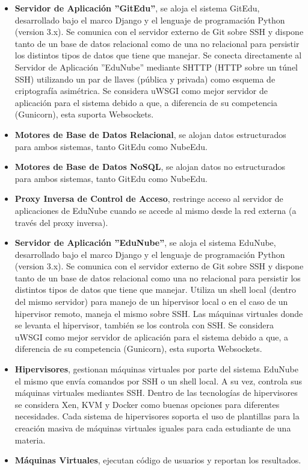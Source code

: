 \begin{itemize}
    \item \textbf{Servidor de Aplicación ''GitEdu''}, se aloja el sistema GitEdu, desarrollado bajo el marco Django y el lenguaje de programación Python (version 3.x). Se comunica con el servidor externo de Git sobre SSH y dispone tanto de un base de datos relacional como de una no relacional para persistir los distintos tipos de datos que tiene que manejar. Se conecta directamente al Servidor de Aplicación ''EduNube'' mediante SHTTP (HTTP sobre un túnel SSH) utilizando un par de llaves (pública y privada) como esquema de criptografía asimétrica. Se considera uWSGI como mejor servidor de aplicación para el sistema debido a que, a diferencia de su competencia (Gunicorn), esta suporta Websockets.
    \item \textbf{Motores de Base de Datos Relacional}, se alojan datos estructurados para ambos sistemas, tanto GitEdu como NubeEdu.
    \item \textbf{Motores de Base de Datos NoSQL}, se alojan datos no estructurados para ambos sistemas, tanto GitEdu como NubeEdu.
    \item \textbf{Proxy Inversa de Control de Acceso}, restringe acceso al servidor de aplicaciones de EduNube cuando se accede al mismo desde la red externa (a través del proxy inversa).
    \item \textbf{Servidor de Aplicación ''EduNube''}, se aloja el sistema EduNube, desarrollado bajo el marco Django y el lenguaje de programación Python (version 3.x). Se comunica con el servidor externo de Git sobre SSH y dispone tanto de un base de datos relacional como una no relacional para persistir los distintos tipos de datos que tiene que manejar. Utiliza un shell local (dentro del mismo servidor) para manejo de un hipervisor local o en el caso de un hipervisor remoto, maneja el mismo sobre SSH. Las máquinas virtuales donde se levanta el hipervisor, también se los controla con SSH. Se considera uWSGI como mejor servidor de aplicación para el sistema debido a que, a diferencia de su competencia (Gunicorn), esta suporta Websockets.
    \item \textbf{Hipervisores}, gestionan máquinas virtuales por parte del sistema EduNube el mismo que envía comandos por SSH o un shell local. A su vez, controla sus máquinas virtuales mediantes SSH. Dentro de las tecnologías de hipervisores se considera Xen, KVM y Docker como buenas opciones para diferentes necesidades. Cada sistema de hipervisores soporta el uso de plantillas para la creación masiva de máquinas virtuales iguales para cada estudiante de una materia.
    \item \textbf{Máquinas Virtuales}, ejecutan código de usuarios y reportan los resultados.
\end{itemize}

